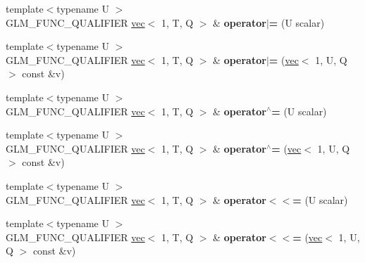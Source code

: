 \begin{DoxyCompactItemize}
{\footnotesize template$<$typename U $>$ }\\G\+L\+M\+\_\+\+F\+U\+N\+C\+\_\+\+Q\+U\+A\+L\+I\+F\+I\+ER \hyperlink{structglm_1_1vec}{vec}$<$ 1, T, Q $>$ \& {\bfseries operator$\vert$=} (U scalar)
\item 
\mbox{\label{structglm_1_1vec_3_011_00_01T_00_01Q_01_4_ae04eabedc72a049a89d3c54b65a2b99a}} 
{\footnotesize template$<$typename U $>$ }\\G\+L\+M\+\_\+\+F\+U\+N\+C\+\_\+\+Q\+U\+A\+L\+I\+F\+I\+ER \hyperlink{structglm_1_1vec}{vec}$<$ 1, T, Q $>$ \& {\bfseries operator$\vert$=} (\hyperlink{structglm_1_1vec}{vec}$<$ 1, U, Q $>$ const \&v)
\item 
\mbox{\label{structglm_1_1vec_3_011_00_01T_00_01Q_01_4_a3df3927c90bdfb42be0084efc352f15d}} 
{\footnotesize template$<$typename U $>$ }\\G\+L\+M\+\_\+\+F\+U\+N\+C\+\_\+\+Q\+U\+A\+L\+I\+F\+I\+ER \hyperlink{structglm_1_1vec}{vec}$<$ 1, T, Q $>$ \& {\bfseries operator$^\wedge$=} (U scalar)
\item 
\mbox{\label{structglm_1_1vec_3_011_00_01T_00_01Q_01_4_ae225253572ebcba4fe52175e1b926591}} 
{\footnotesize template$<$typename U $>$ }\\G\+L\+M\+\_\+\+F\+U\+N\+C\+\_\+\+Q\+U\+A\+L\+I\+F\+I\+ER \hyperlink{structglm_1_1vec}{vec}$<$ 1, T, Q $>$ \& {\bfseries operator$^\wedge$=} (\hyperlink{structglm_1_1vec}{vec}$<$ 1, U, Q $>$ const \&v)
\item 
\mbox{\label{structglm_1_1vec_3_011_00_01T_00_01Q_01_4_a4424082249c3a13912bb00816f8a3a56}} 
{\footnotesize template$<$typename U $>$ }\\G\+L\+M\+\_\+\+F\+U\+N\+C\+\_\+\+Q\+U\+A\+L\+I\+F\+I\+ER \hyperlink{structglm_1_1vec}{vec}$<$ 1, T, Q $>$ \& {\bfseries operator$<$$<$=} (U scalar)
\item 
\mbox{\label{structglm_1_1vec_3_011_00_01T_00_01Q_01_4_a129ec8874e812e787c380255b92468fa}} 
{\footnotesize template$<$typename U $>$ }\\G\+L\+M\+\_\+\+F\+U\+N\+C\+\_\+\+Q\+U\+A\+L\+I\+F\+I\+ER \hyperlink{structglm_1_1vec}{vec}$<$ 1, T, Q $>$ \& {\bfseries operator$<$$<$=} (\hyperlink{structglm_1_1vec}{vec}$<$ 1, U, Q $>$ const \&v)

\end{DoxyCompactItemize}
